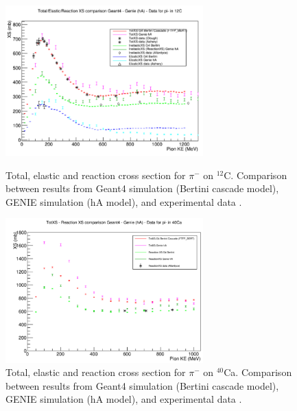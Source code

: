 \begin{figure}
\captionsetup{justification=raggedright}  
	\begin{minipage}[t]{.53\textwidth}  
	  \centering  
	   \includegraphics[width=3in]{Chapter-1/Images/IreneCarbon.png}
	   	        \caption{ Total, elastic and reaction cross section for $\pi^-$ on $^{12}$C. Comparison between results from Geant4 simulation (Bertini cascade model), GENIE simulation (hA model), and experimental data \cite{Clough1974, PhysRevC.23.2173, ALLARDYCE19731,osti_4488432}.}
        \label{fig:pionC}
	\end{minipage}%
	\begin{minipage}[t]{0.53\textwidth}  
	  \centering  
	\includegraphics[width=3in]{Chapter-1/Images/IreneCalcium.png}
        \caption{Total, elastic and reaction cross section for $\pi^-$ on $^{40}$Ca. Comparison between results from Geant4 simulation (Bertini cascade model),  GENIE simulation (hA model), and experimental data \cite{ALLARDYCE19731}.}
        \label{fig:pionCa}
	\end{minipage}
	\par
\end{figure}

